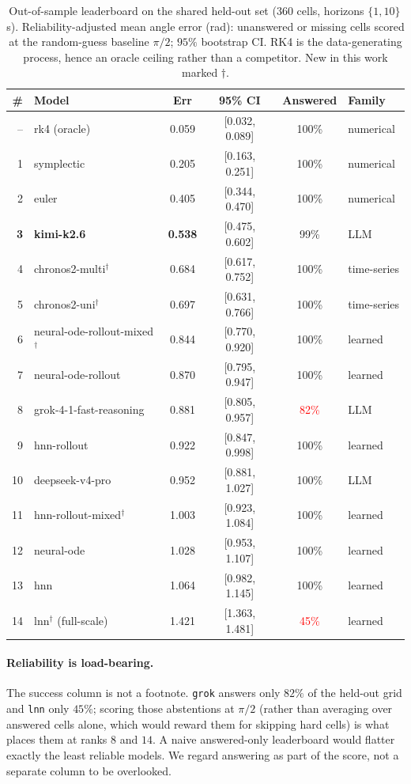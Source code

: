 \documentclass{article}
\begin{document}
\begin{table}[t]
\centering\small
\caption{Out-of-sample leaderboard on the shared held-out set ($360$ cells,
horizons $\{1,10\}$\,s). Reliability-adjusted mean angle error (rad): unanswered or
missing cells scored at the random-guess baseline $\pi/2$; $95\%$ bootstrap CI.
RK4 is the data-generating process, hence an oracle ceiling rather than a competitor. New in this work marked $\dagger$.}
\label{tab:overall}
\begin{tabular}{rlcccl}
\toprule
\# & Model & Err & 95\% CI & Answered & Family \\
\midrule
-- & rk4 (oracle) & 0.059 & [0.032, 0.089] & 100\% & numerical \\
1 & symplectic & 0.205 & [0.163, 0.251] & 100\% & numerical \\
2 & euler & 0.405 & [0.344, 0.470] & 100\% & numerical \\
\textbf{3} & \textbf{kimi-k2.6} & \textbf{0.538} & [0.475, 0.602] & 99\% & LLM \\
4 & chronos2-multi$^\dagger$ & 0.684 & [0.617, 0.752] & 100\% & time-series \\
5 & chronos2-uni$^\dagger$ & 0.697 & [0.631, 0.766] & 100\% & time-series \\
6 & neural-ode-rollout-mixed$^\dagger$ & 0.844 & [0.770, 0.920] & 100\% & learned \\
7 & neural-ode-rollout & 0.870 & [0.795, 0.947] & 100\% & learned \\
8 & grok-4-1-fast-reasoning & 0.881 & [0.805, 0.957] & \textcolor{red}{82\%} & LLM \\
9 & hnn-rollout & 0.922 & [0.847, 0.998] & 100\% & learned \\
10 & deepseek-v4-pro & 0.952 & [0.881, 1.027] & 100\% & LLM \\
11 & hnn-rollout-mixed$^\dagger$ & 1.003 & [0.923, 1.084] & 100\% & learned \\
12 & neural-ode & 1.028 & [0.953, 1.107] & 100\% & learned \\
13 & hnn & 1.064 & [0.982, 1.145] & 100\% & learned \\
14 & lnn$^\dagger$ (full-scale) & 1.421 & [1.363, 1.481] & \textcolor{red}{45\%} & learned \\
\bottomrule
\end{tabular}
\end{table}

\paragraph{Reliability is load-bearing.} The success column is not a footnote.
\texttt{grok} answers only $82\%$ of the held-out grid and \texttt{lnn} only $45\%$;
scoring those abstentions at $\pi/2$ (rather than averaging over answered cells
alone, which would reward them for skipping hard cells) is what places them at ranks
$8$ and $14$. A naive answered-only leaderboard would flatter exactly the least
reliable models. We regard answering as part of the score, not a separate column to
be overlooked.
\end{document}
